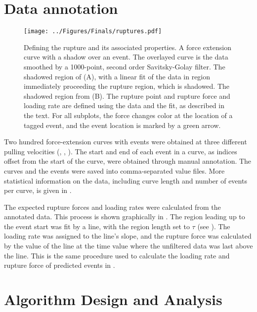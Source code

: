 \section{Data annotation}


\begin{figure}[htpb]
\caption[Definition of rupture force and loading rate]{ Defining the rupture and its associated properties.  A force extension curve with a shadow over an event. The overlayed curve is the data smoothed by a 1000-point, second order Savitsky-Golay filter.  The shadowed region of (A), with a linear fit of the data in region immediately proceeding the rupture region, which is shadowed.  The shadowed region from (B). The rupture point and rupture force and loading rate are defined using the data and the fit, as described in the text. For all subplots, the force changes color at the location of a tagged event, and the event location is marked by a green arrow. }
\centering
\texttt{[image: ../Figures/Finals/ruptures.pdf]}%
\end{figure}

Two hundred force-extension curves with events were obtained at three different pulling velocities (, , ). The start and end of each event in a curve, as indices offset from the start of the curve, were obtained through manual annotation. The curves and the events were saved into comma-separated value files. More statistical information on the data, including curve length and number of events per curve, is given in .

The expected rupture forces and loading rates were calculated from the annotated data. This process is shown graphically in . The region leading up to the event start was fit by a line, with the region length set to $\tau$ (see ). The loading rate was assigned to the line's slope, and the rupture force was calculated by the value of the line at the time value where the unfiltered data was last above the line. This is the same procedure used to calculate the loading rate and rupture force of predicted events in . 



\section{Algorithm Design and Analysis}

